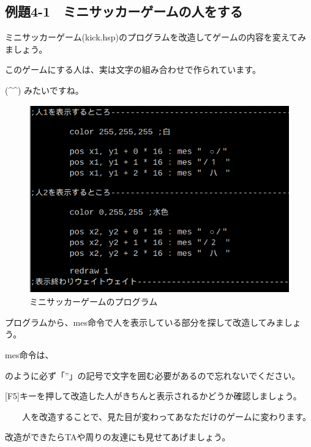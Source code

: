 \newpage
\subsection{例題4-1　ミニサッカーゲームの人をする}

\begin{description}
    \item {}
\end{description}

ミニサッカーゲーム(kick.hsp)のプログラムを改造してゲームの内容を変えてみましょう。

このゲームにする人は、実は文字の組み合わせで作られています。

(\^{}\^{}) みたいですね。


\begin{figure}[H]
    \begin{center}
      \includegraphics[keepaspectratio,width=12.326cm,height=8.123cm]{text04-img/text04-img007.png}
      \caption{ミニサッカーゲームのプログラム}
    \end{center}
    \label{fig:prog_menu}
\end{figure}



プログラムから、mes命令で人を表示している部分を探して改造してみましょう。

mes命令は、

\begin{description}
    \item {}
\end{description}


のように必ず「”」の記号で文字を囲む必要があるので忘れないでください。

\begin{description}
    \item {}
\end{description}


[F5]キーを押して改造した人がきちんと表示されるかどうか確認しましょう。

\ \ \ \ 人を改造することで、見た目が変わってあなただけのゲームに変わります。

改造ができたらTAや周りの友達にも見せてあげましょう。

\clearpage





